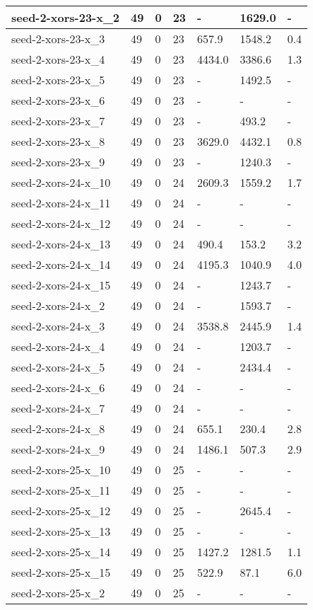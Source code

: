 \begin{scriptsize}
\begin{longtable}{|p{5cm}|l|l|l|l|l|l|}
seed-2-xors-23-x\_2&49&0&23&-&1629.0&- \\ \hline 
seed-2-xors-23-x\_3&49&0&23&657.9&1548.2&0.4 \\ \hline 
seed-2-xors-23-x\_4&49&0&23&4434.0&3386.6&1.3 \\ \hline 
seed-2-xors-23-x\_5&49&0&23&-&1492.5&- \\ \hline 
seed-2-xors-23-x\_6&49&0&23&-&-&- \\ \hline 
seed-2-xors-23-x\_7&49&0&23&-&493.2&- \\ \hline 
seed-2-xors-23-x\_8&49&0&23&3629.0&4432.1&0.8 \\ \hline 
seed-2-xors-23-x\_9&49&0&23&-&1240.3&- \\ \hline 
seed-2-xors-24-x\_10&49&0&24&2609.3&1559.2&1.7 \\ \hline 
seed-2-xors-24-x\_11&49&0&24&-&-&- \\ \hline 
seed-2-xors-24-x\_12&49&0&24&-&-&- \\ \hline 
seed-2-xors-24-x\_13&49&0&24&490.4&153.2&3.2 \\ \hline 
seed-2-xors-24-x\_14&49&0&24&4195.3&1040.9&4.0 \\ \hline 
seed-2-xors-24-x\_15&49&0&24&-&1243.7&- \\ \hline 
seed-2-xors-24-x\_2&49&0&24&-&1593.7&- \\ \hline 
seed-2-xors-24-x\_3&49&0&24&3538.8&2445.9&1.4 \\ \hline 
seed-2-xors-24-x\_4&49&0&24&-&1203.7&- \\ \hline 
seed-2-xors-24-x\_5&49&0&24&-&2434.4&- \\ \hline 
seed-2-xors-24-x\_6&49&0&24&-&-&- \\ \hline 
seed-2-xors-24-x\_7&49&0&24&-&-&- \\ \hline 
seed-2-xors-24-x\_8&49&0&24&655.1&230.4&2.8 \\ \hline 
seed-2-xors-24-x\_9&49&0&24&1486.1&507.3&2.9 \\ \hline 
seed-2-xors-25-x\_10&49&0&25&-&-&- \\ \hline 
seed-2-xors-25-x\_11&49&0&25&-&-&- \\ \hline 
seed-2-xors-25-x\_12&49&0&25&-&2645.4&- \\ \hline 
seed-2-xors-25-x\_13&49&0&25&-&-&- \\ \hline 
seed-2-xors-25-x\_14&49&0&25&1427.2&1281.5&1.1 \\ \hline 
seed-2-xors-25-x\_15&49&0&25&522.9&87.1&6.0 \\ \hline 
seed-2-xors-25-x\_2&49&0&25&-&-&- \\ \hline 

\end{longtable}
\end{scriptsize}
